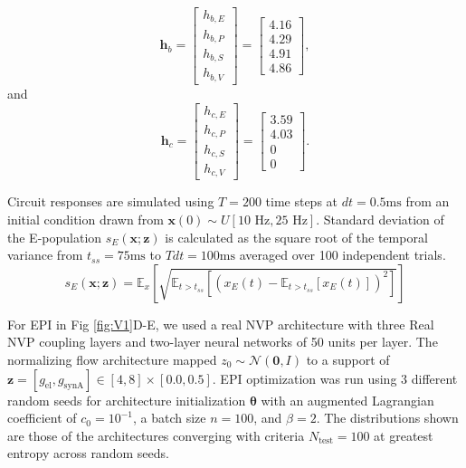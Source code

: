 \documentclass[11pt]{article}
\begin{document}
\begin{equation}
\mathbf{h}_b =  \begin{bmatrix} h_{b,E} \\ h_{b,P} \\ h_{b,S} \\ h_{b,V} \end{bmatrix} =
 \begin{bmatrix} 4.16 \\ 4.29 \\ 4.91 \\ 4.86 \end{bmatrix} ,
\end{equation} 
and
\begin{equation} 
\mathbf{h}_c = \begin{bmatrix} h_{c,E} \\ h_{c,P} \\ h_{c,S} \\ h_{c,V} \end{bmatrix} = 
\begin{bmatrix} 3.59 \\ 4.03 \\ 0 \\ 0 \end{bmatrix}.
\end{equation} 

Circuit responses are simulated using $T = 200$ time steps at $dt = 0.5\text{ms}$ from an initial condition drawn from $\mathbf{x}(0) \sim U\left[10\text{ Hz}, 25\text{ Hz}\right]$.
Standard deviation of the E-population $s_E(\mathbf{x}; \mathbf{z})$ is calculated as the square root of the temporal variance from $t_{ss} = 75\text{ms}$ to $Tdt = 100\text{ms}$ averaged over 100 independent trials.
\begin{equation}
s_E(\mathbf{x}; \mathbf{z}) =\mathbb{E}_{x}\left[\sqrt{\mathbb{E}_{t > t_{ss}}\left[\left(x_E(t) -\mathbb{E}_{t > t_{ss}}\left[ x_E(t) \right]\right)^2 \right]}\right]
\end{equation}

For EPI in Fig \ref{fig:V1}D-E, we used a real NVP architecture with three Real NVP coupling layers and two-layer neural networks of 50 units per layer.
The normalizing flow architecture mapped $z_0 \sim \mathcal{N}(\mathbf{0}, I)$ to a support of $\mathbf{z} = [g_{\text{el}}, g_{\text{synA}}] \in [4,8] \times [0.0, 0.5]$.
EPI optimization was run using 3 different random seeds for architecture initialization $\bm{\theta}$ with an augmented Lagrangian coefficient of $c_0 = 10^{-1}$, a batch size $n=100$, and $\beta = 2$.
The distributions shown are those of the architectures converging with criteria $N_{\text{test}} = 100$ at greatest entropy across random seeds.
\end{document}
